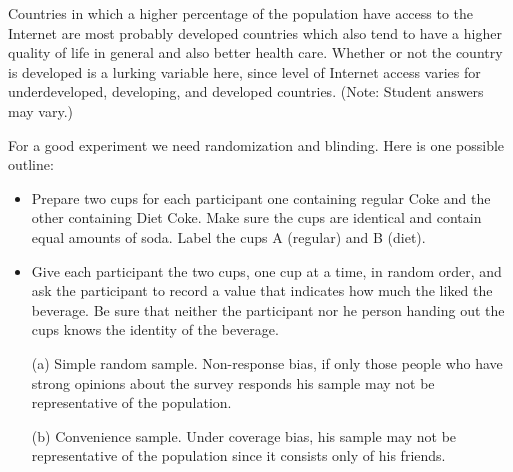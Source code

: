 %

{
Countries in which a higher percentage of the population have access to the Internet are most probably developed countries which also tend to have a higher quality of life in general and also better health care. Whether or not the country is developed is a lurking variable here, since level of Internet access varies for underdeveloped, developing, and developed countries. (Note: Student answers may vary.)
}

%

{
For a good experiment we need randomization and blinding. Here is one possible outline:
\begin{itemize}
\item Prepare two cups for each participant one containing regular Coke and the other containing Diet Coke. Make sure the cups are identical and contain equal amounts of soda. Label the cups A (regular) and B (diet).
\item Give each participant the two cups, one cup at a time, in random order, and ask the participant to record a value that indicates how much the liked the beverage.  Be sure that neither the participant nor he person handing out the cups knows the identity of the beverage.
\end{itemize}
}

%

{
\begin{enumerate}
\item[(a)] Simple random sample. Non-response bias, if only those people who have strong opinions about the survey responds his sample may not be representative of the population.
\item[(b)] Convenience sample. Under coverage bias, his sample may not be representative of the population since it consists only of his friends.
\end{enumerate}
}

